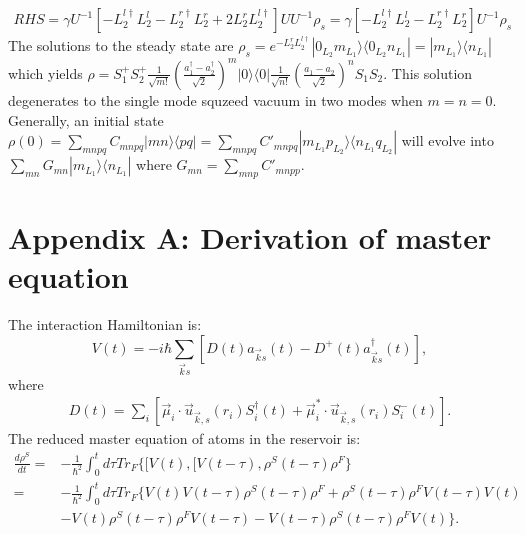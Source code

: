 \documentclass{article}
\begin{document}
\begin{equation}
\label{eq18}
\begin{split}
RHS=\gamma U^{-1}[-L_2^{l\dagger}L_2^{l}-L_2^{r\dagger}L_2^{r}+2L_2^{r}L_2^{l\dagger}]UU^{-1}\rho_{s}=\gamma[-L_2^{l\dagger}L_2^{l}-L_2^{r\dagger}L_2^{r}]U^{-1}\rho_{s}
\end{split}
\end{equation}
The solutions to the steady state are $\rho_{s}=e^{-L_{2}^{r}L_{2}^{l\dagger}}|0_{L_{2}}m_{L_{1}}\rangle\langle0_{L_{2}}n_{L_{1}}|=|m_{L_{1}}\rangle\langle n_{L_{1}}|$ which yields $\rho=S_{1}^{+}S_{2}^{+}\frac{1}{\sqrt{m!}}(\frac{a_{1}^{\dagger}-a_{2}^{\dagger}}{\sqrt{2}})^{m}|0\rangle\langle0|\frac{1}{\sqrt{n!}}(\frac{a_{1}-a_{2}}{\sqrt{2}})^{n}S_{1}S_{2}$. This solution degenerates to the single mode squzeed vacuum in two modes when $m=n=0$. Generally, an initial state $\rho(0)=\sum_{mnpq}C_{mnpq}|mn\rangle\langle pq|=\sum_{mnpq}C'_{mnpq}|m_{L_{1}}p_{L_{2}}\rangle\langle n_{L_{1}}q_{L_{2}}|$ will evolve into $\sum_{mn}G_{mn}|m_{L_{1}}\rangle\langle n_{L_{1}}|$ where $G_{mn}=\sum_{mnp}C'_{mnpp}$.

\appendix

\section{Appendix A: Derivation of master equation}
The interaction Hamiltonian is:
\begin{equation}
\label{eqa0}\tag{A1}
V(t)=-i\hbar \sum_{\vec{k}s}[D(t)a_{\vec{k}s}(t)-D^{+}(t)a^{\dagger}_{\vec{k}s}(t)],
\end{equation}
where
\begin{equation}
\label{eqa1}\tag{A2}
\begin{gathered}
 D(t)=\underset{i}{\sum}[\vec{\mu}_{i}\cdot\vec{u}_{\vec{k},s}(r_{i})S_{i}^{\dagger}(t)+\vec{\mu}^{*}_{i}\cdot\vec{u}_{\vec{k},s}(r_{i})S_{i}^{-}(t)]. 
 \end{gathered}
\end{equation}
The reduced master equation of atoms in the reservoir is:
\begin{equation}
\label{eqa2}\tag{A3}
\begin{split}
\frac{d\rho^{S}}{dt}=&-\frac{1}{\hbar^{2}}\int_{0}^{t}d\tau Tr_{F}\{[V(t),[V(t-\tau),\rho^{S}(t-\tau)\rho^{F}\}\\
=&-\frac{1}{\hbar^{2}}\int_{0}^{t}d\tau Tr_{F}\{V(t)V(t-\tau)\rho^{S}(t-\tau)\rho^{F}+\rho^{S}(t-\tau)\rho^{F}V(t-\tau)V(t)\\
&-V(t)\rho^{S}(t-\tau)\rho^{F}V(t-\tau)-V(t-\tau)\rho^{S}(t-\tau)\rho^{F}V(t)\}.
\end{split}
\end{equation} 
\end{document}
